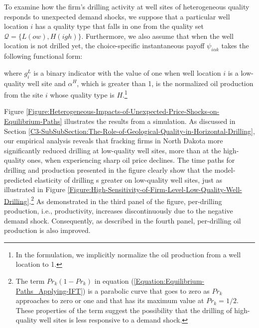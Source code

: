 To examine how the firm's drilling activity at well sites of heterogeneous quality responds to unexpected demand shocks, we suppose that a particular well location $i$ has a quality type that falls in one from the quality set $\mathcal{Q} = \{ L(ow), H(igh) \}$. Furthermore, we also assume that when the well location is not drilled yet, the choice-specific instantaneous payoff $\psi_{i \alpha k}$ takes the following functional form:

where $g_{i}^{L}$ is a binary indicator with the value of one when well location $i$ is a low-quality well site and $\alpha^{H}$, which is greater than 1, is the normalized oil production from the site $i$ whose quality type is $H$.\footnote{In the formulation, we implicitly normalize the oil production from a well location to 1.} 

Figure \ref{Figure:Heterogeneous-Impacts-of-Unexpected-Price-Shocks-on-Equilibrium-Paths} illustrates the results from a simulation. As discussed in Section \ref{C3-SubSubSection:The-Role-of-Geological-Quality-in-Horizontal-Drilling}, our empirical analysis reveals that fracking firms in North Dakota more significantly reduced drilling at low-quality well sites, more than at the high-quality ones, when experiencing sharp oil price declines. The time paths for drilling and production presented in the figure clearly show that the model-predicted elasticity of drilling s greater on low-quality well sites, just as illustrated in Figure \ref{Figure:High-Sensitivity-of-Firm-Level-Low-Quality-Well-Drilling}.\footnote{The term $Pr_{k}(1 - Pr_{k})$ in equation (\ref{Equation:Equilibrium-Paths_Applying-IFT}) is a parabolic curve that goes to zero as $Pr_{k}$ approaches to zero or one and that has its maximum value at $Pr_{k} = 1/2$. These properties of the term suggest the possibility that the drilling of high-quality well sites is less responsive to a demand shock.} As demonstrated in the third panel of the figure, per-drilling production, i.e., productivity, increases discontinuously due to the negative demand shock. Consequently, as described in the fourth panel, per-drilling oil production is also improved. 
